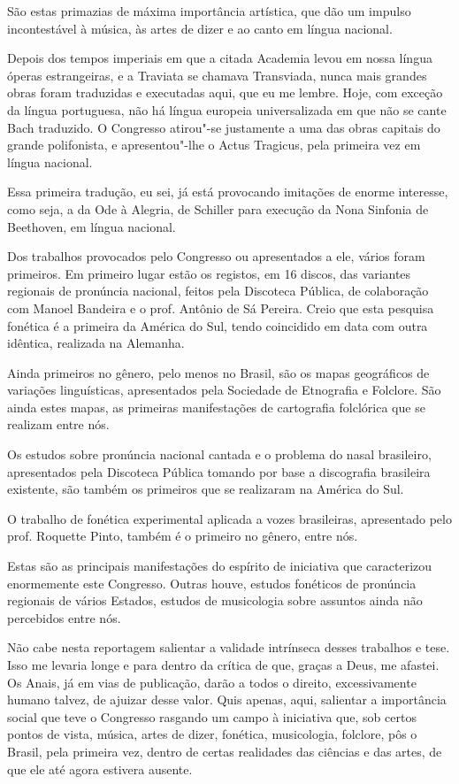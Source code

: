 São estas primazias de máxima importância artística, que dão um impulso
incontestável à música, às artes de dizer e ao canto em língua nacional.

Depois dos tempos imperiais em que a citada Academia levou em nossa
língua óperas estrangeiras, e a Traviata se chamava Transviada, nunca
mais grandes obras foram traduzidas e executadas aqui, que eu me lembre.
Hoje, com exceção da língua portuguesa, não há língua europeia
universalizada em que não se cante Bach traduzido. O Congresso atirou"-se
justamente a uma das obras capitais do grande polifonista, e
apresentou"-lhe o Actus Tragicus, pela primeira vez em língua nacional.

Essa primeira tradução, eu sei, já está provocando imitações de enorme
interesse, como seja, a da Ode à Alegria, de Schiller para execução da
Nona Sinfonia de Beethoven, em língua nacional.

Dos trabalhos provocados pelo Congresso ou apresentados a ele, vários
foram primeiros. Em primeiro lugar estão os registos, em 16 discos, das
variantes regionais de pronúncia nacional, feitos pela Discoteca
Pública, de colaboração com Manoel Bandeira e o prof. Antônio de Sá
Pereira. Creio que esta pesquisa fonética é a primeira da América do
Sul, tendo coincidido em data com outra idêntica, realizada na Alemanha.

Ainda primeiros no gênero, pelo menos no Brasil, são os mapas
geográficos de variações linguísticas, apresentados pela Sociedade de
Etnografia e Folclore. São ainda estes mapas, as primeiras manifestações
de cartografia folclórica que se realizam entre nós.

Os estudos sobre pronúncia nacional cantada e o problema do nasal
brasileiro, apresentados pela Discoteca Pública tomando por base a
discografia brasileira existente, são também os primeiros que se
realizaram na América do Sul.

O trabalho de fonética experimental aplicada a vozes brasileiras,
apresentado pelo prof. Roquette Pinto, também é o primeiro no gênero,
entre nós.

Estas são as principais manifestações do espírito de iniciativa que
caracterizou enormemente este Congresso. Outras houve, estudos fonéticos
de pronúncia regionais de vários Estados, estudos de musicologia sobre
assuntos ainda não percebidos entre nós.

Não cabe nesta reportagem salientar a validade intrínseca desses
trabalhos e tese. Isso me levaria longe e para dentro da crítica de que,
graças a Deus, me afastei. Os Anais, já em vias de publicação, darão a
todos o direito, excessivamente humano talvez, de ajuizar desse valor.
Quis apenas, aqui, salientar a importância social que teve o Congresso
rasgando um campo à iniciativa que, sob certos pontos de vista, música,
artes de dizer, fonética, musicologia, folclore, pôs o Brasil, pela
primeira vez, dentro de certas realidades das ciências e das artes, de
que ele até agora estivera ausente.

